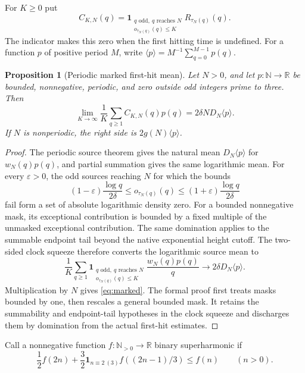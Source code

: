 \documentclass[11pt]{article}
\newtheorem{proposition}[theorem]{Proposition}
\theoremstyle{remark}
\newcommand{\NN}{\mathbb N_{>0}}
\newcommand{\one}{\mathbf 1}
\newcommand{\avg}[1]{\langle #1\rangle}
\begin{document}
For \(K\geq0\) put
\[
 C_{K,N}(q)=
 \one_{\substack{q\text{ odd},\ q\text{ reaches }N\\
                   o_{\tau_N(q)}(q)\leq K}}
 R_{\tau_N(q)}(q).
\]
The indicator makes this zero when the first hitting time is
undefined. For a function \(p\) of positive period \(M\), write
\(\avg p=M^{-1}\sum_{q=0}^{M-1}p(q)\).

\begin{proposition}[Periodic marked first-hit mean]\label{prop:marked}
Let \(N>0\), and let \(p:\mathbb N\to\mathbb R\) be bounded,
nonnegative, periodic, and zero outside odd integers prime to three.
Then
\begin{equation}\label{eq:marked}
 \lim_{K\to\infty}\frac1K\sum_{q\geq1}C_{K,N}(q)p(q)
       =2\delta N D_N\avg p.
\end{equation}
If \(N\) is nonperiodic, the right side is \(2g(N)\avg p\).
\end{proposition}

\begin{proof}
The periodic source theorem gives the natural mean
\(D_N\avg p\) for \(w_N(q)p(q)\), and partial summation gives
the same logarithmic mean. For every \(\varepsilon>0\), the odd
sources reaching \(N\) for which the bounds
\[
 (1-\varepsilon)\frac{\log q}{2\delta}
 \leq o_{\tau_N(q)}(q)
 \leq(1+\varepsilon)\frac{\log q}{2\delta}
\]
fail form a set of absolute logarithmic density zero. For a bounded
nonnegative mask, its exceptional contribution is bounded by a fixed
multiple of the unmasked exceptional contribution. The same domination
applies to the summable endpoint tail beyond the native exponential
height cutoff. The two-sided clock squeeze therefore converts the
logarithmic source mean to
\[
 \frac1K\sum_{q\geq1}
 \one_{\substack{q\text{ odd},\ q\text{ reaches }N\\o_{\tau_N(q)}(q)\leq K}}
 \frac{w_N(q)p(q)}q
 \longrightarrow 2\delta D_N\avg p.
\]
Multiplication by \(N\) gives \eqref{eq:marked}.
The formal proof first treats masks bounded by one, then rescales a
general bounded mask. It retains the summability and endpoint-tail
hypotheses in the clock squeeze and discharges them by domination
from the actual first-hit estimates.
\end{proof}

Call a nonnegative function \(f:\NN\to\mathbb R\) binary
superharmonic if
\begin{equation}\label{eq:superharmonic}
 \frac12 f(2n)+\frac32\one_{n\equiv2\ (3)}f((2n-1)/3)\leq f(n)
 \qquad(n>0).
\end{equation}
\end{document}
